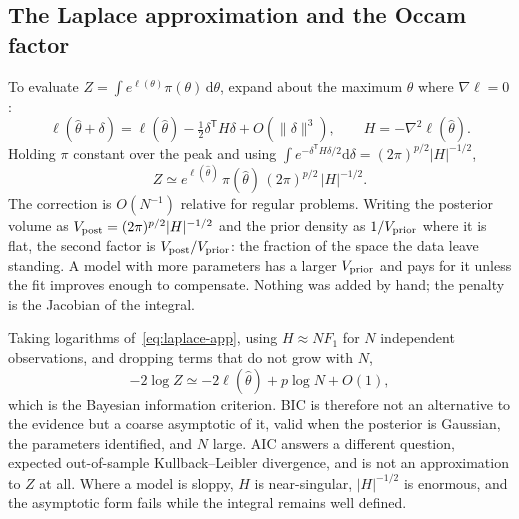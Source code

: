 \documentclass[10pt]{article}
\begin{document}
\subsection{The Laplace approximation and the Occam factor}

To evaluate $Z = \int e^{\ell(\theta)}\pi(\theta)\,\mathrm{d}\theta$, expand about the
maximum $\hat\theta$ where $\nabla\ell = 0$:
%
\begin{equation}
\ell(\hat\theta + \delta) = \ell(\hat\theta)
  - \tfrac12\delta^{\mathsf T}H\delta + O(\|\delta\|^3),
\qquad H = -\nabla^2\ell(\hat\theta).
\end{equation}
%
Holding $\pi$ constant over the peak and using
$\int e^{-\delta^{\mathsf T}H\delta/2}\mathrm{d}\delta = (2\pi)^{p/2}|H|^{-1/2}$,
%
\begin{equation}
Z \simeq e^{\ell(\hat\theta)}\,\pi(\hat\theta)\,(2\pi)^{p/2}\,|H|^{-1/2} .
\label{eq:laplace-app}
\end{equation}
%
The correction is $O(N^{-1})$ relative for regular problems. Writing the posterior volume as
$V_{\rm post} = (2\pi)^{p/2}|H|^{-1/2}$ and the prior density as $1/V_{\rm prior}$ where it
is flat, the second factor is $V_{\rm post}/V_{\rm prior}$: the fraction of the space the
data leave standing. A model with more parameters has a larger $V_{\rm prior}$ and pays for
it unless the fit improves enough to compensate. Nothing was added by hand; the penalty is
the Jacobian of the integral.

Taking logarithms of~\eqref{eq:laplace-app}, using $H \approx N F_1$ for $N$ independent
observations, and dropping terms that do not grow with $N$,
%
\begin{equation}
-2\log Z \simeq -2\ell(\hat\theta) + p\log N + O(1),
\end{equation}
%
which is the Bayesian information criterion. BIC is therefore not an alternative to the
evidence but a coarse asymptotic of it, valid when the posterior is Gaussian, the parameters
identified, and $N$ large. AIC answers a different question, expected out-of-sample
Kullback--Leibler divergence, and is not an approximation to $Z$ at all. Where a model is
sloppy, $H$ is near-singular, $|H|^{-1/2}$ is enormous, and the asymptotic form fails while
the integral remains well defined.
\end{document}
